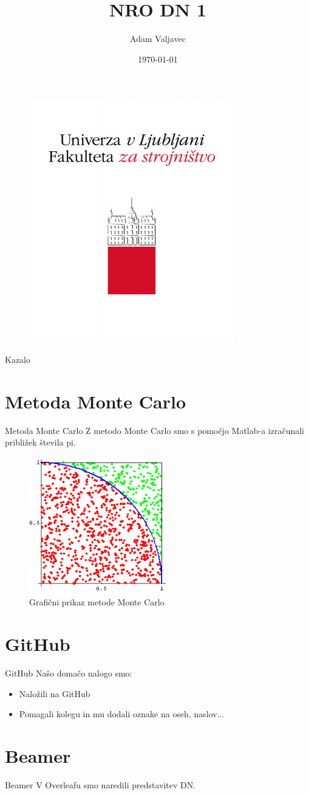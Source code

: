 \documentclass{beamer}
\title{NRO DN 1}
\author{Adam Valjavec}
\institute{Fakulteta za strojništvo}
\date{\today}
\begin{document}
\begin{frame}
  \titlepage

  \begin{figure}
    \includegraphics[width=0.3\linewidth]{ul-fakulteta-za-strojnistvo.jpg}
   
  \end{figure}
\end{frame}

\begin{frame}{Kazalo}
  \tableofcontents
\end{frame}

\section{Metoda Monte Carlo}
\begin{frame}{Metoda Monte Carlo}
  Z metodo Monte Carlo smo s pomočjo Matlab-a izračunali približek števila pi.
  

  \begin{figure}
    \includegraphics[width=0.3\linewidth]{monte_carlo_and_pi_zv.png}
    \caption{Grafični prikaz metode Monte Carlo}
  \end{figure}
\end{frame}

\section{GitHub}
\begin{frame}{GitHub}
  Našo domačo nalogo smo:
  \begin{itemize}
    \item Naložili na GitHub \pause
    \item Pomagali kolegu in mu dodali oznake na oseh, naslov...
  \end{itemize}
\end{frame}

\section{Beamer}
\begin{frame}{Beamer}
 V Overleafu smo naredili predstavitev DN.
  
\end{frame}
\end{document}
